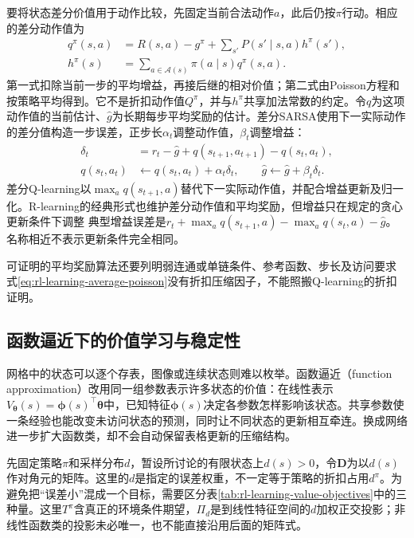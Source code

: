 要将状态差分价值用于动作比较，先固定当前合法动作$a$，此后仍按$\pi$行动。相应的差分动作值为
\[
  \begin{aligned}
    q^\pi(s,a)
      &=R(s,a)-g^\pi
        +\sum_{s'}P(s'\mid s,a)h^\pi(s'),\\
    h^\pi(s)
      &=\sum_{a\in\mathcal A(s)}\pi(a\mid s)q^\pi(s,a).
  \end{aligned}
\]
第一式扣除当前一步的平均增益，再接后继的相对价值；第二式由Poisson方程和按策略平均得到。它不是折扣动作值$Q^\pi$，并与$h^\pi$共享加法常数的约定。令$q$为这项动作值的当前估计、$\widehat g$为长期每步平均奖励的估计。差分SARSA使用下一实际动作的差分值构造一步误差，正步长$\alpha_t$调整动作值，$\beta_t$调整增益：
\[
  \begin{aligned}
    \delta_t&=r_t-\widehat g+q(s_{t+1},a_{t+1})-q(s_t,a_t),\\
    q(s_t,a_t)&\leftarrow q(s_t,a_t)+\alpha_t\delta_t,\qquad
    \widehat g\leftarrow\widehat g+\beta_t\delta_t .
  \end{aligned}
\]
差分Q-learning以$\max_a q(s_{t+1},a)$替代下一实际动作值，并配合增益更新及归一化。R-learning的经典形式也维护差分动作值和平均奖励，但增益只在规定的贪心更新条件下调整
典型增益误差是$r_t+\max_aq(s_{t+1},a)-\max_aq(s_t,a)-\widehat g$。名称相近不表示更新条件完全相同。

可证明的平均奖励算法还要列明弱连通或单链条件、参考函数、步长及访问要求
式\eqref{eq:rl-learning-average-poisson}没有折扣压缩因子，不能照搬Q-learning的折扣证明。

\subsection{函数逼近下的价值学习与稳定性}
\label{sec:rl-learning-approximation}

网格中的状态可以逐个存表，图像或连续状态则难以枚举。函数逼近（function approximation）改用同一组参数表示许多状态的价值：在线性表示$V_{\bm{\theta}}(s)=\bm{\phi}(s)^\top\bm{\theta}$中，已知特征$\bm\phi(s)$决定各参数怎样影响该状态。共享参数使一条经验也能改变未访问状态的预测，同时让不同状态的更新相互牵连。换成网络进一步扩大函数类，却不会自动保留表格更新的压缩结构。

先固定策略$\pi$和采样分布$d$，暂设所讨论的有限状态上$d(s)>0$，令$\bm{D}$为以$d(s)$作对角元的矩阵。这里的$d$是指定的误差权重，不一定等于策略的折扣占用$d^\pi$。为避免把“误差小”混成一个目标，需要区分表\ref{tab:rl-learning-value-objectives}中的三种量。这里$T^\pi$含真正的环境条件期望，$\Pi_d$是到线性特征空间的$d$加权正交投影；非线性函数类的投影未必唯一，也不能直接沿用后面的矩阵式。

